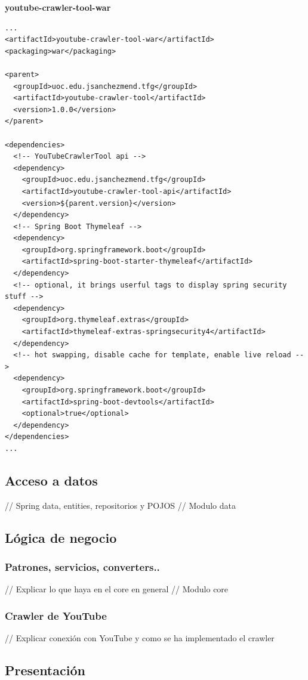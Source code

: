 \documentclass[11pt,a4paper]{article}
\begin{document}
\noindent\textbf{youtube-crawler-tool-war}
\begin{lstlisting}[style=C]
...
<artifactId>youtube-crawler-tool-war</artifactId>
<packaging>war</packaging>

<parent>
  <groupId>uoc.edu.jsanchezmend.tfg</groupId>
  <artifactId>youtube-crawler-tool</artifactId>
  <version>1.0.0</version>
</parent>

<dependencies>
  <!-- YouTubeCrawlerTool api -->
  <dependency>
    <groupId>uoc.edu.jsanchezmend.tfg</groupId>
    <artifactId>youtube-crawler-tool-api</artifactId>
    <version>${parent.version}</version>
  </dependency>
  <!-- Spring Boot Thymeleaf -->
  <dependency>
    <groupId>org.springframework.boot</groupId>
    <artifactId>spring-boot-starter-thymeleaf</artifactId>
  </dependency>
  <!-- optional, it brings userful tags to display spring security stuff -->
  <dependency>
    <groupId>org.thymeleaf.extras</groupId>
    <artifactId>thymeleaf-extras-springsecurity4</artifactId>
  </dependency>
  <!-- hot swapping, disable cache for template, enable live reload -->
  <dependency>
    <groupId>org.springframework.boot</groupId>
    <artifactId>spring-boot-devtools</artifactId>
    <optional>true</optional>
  </dependency>
</dependencies>
...
\end{lstlisting}
\pagebreak 

\subsection{Acceso a datos}
// Spring data, entities, repositorios y POJOS
// Modulo data
\medskip 

\subsection{Lógica de negocio}
\medskip 
\subsubsection{Patrones, servicios, converters..}
// Explicar lo que haya en el core en general
// Modulo core
\medskip 
\subsubsection{Crawler de YouTube}
// Explicar conexión con YouTube y como se ha implementado el crawler
\medskip

\subsection{Presentación}
\medskip 
\end{document}
